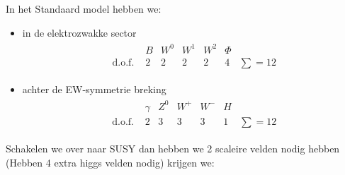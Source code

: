\documentclass[../main.tex]{subfiles}
\begin{document}
In het Standaard model hebben we:
\begin{itemize}
    \item in de elektrozwakke sector
        \begin{equation}
            \begin{aligned}
                \label{eq:susy_deeltjes_3}
                \begin{array}{lcccccc} 
                                        & B & W^{0} & W^{1} & W^{2} & \Phi  & \\
                    \text { d.o.f. }    & 2 & 2     & 2     & 2     & 4     & \sum=12
                \end{array}
            \end{aligned}
        \end{equation}
    \item achter de EW-symmetrie breking
        \begin{equation}
            \begin{aligned}
                \label{eq:susy_deeltjes_4}
                \begin{array}{lcccccc} 
                                        & \gamma & Z^{0} & W^{+} & W^{-} & H  & \\
                    \text { d.o.f. }    & 2 & 3     & 3     & 3     & 1     & \sum=12
                \end{array}
            \end{aligned}
        \end{equation}
\end{itemize}
Schakelen we over naar SUSY dan hebben we 2 scaleire velden nodig hebben (Hebben 4 extra higgs velden nodig) krijgen we:
\end{document}
